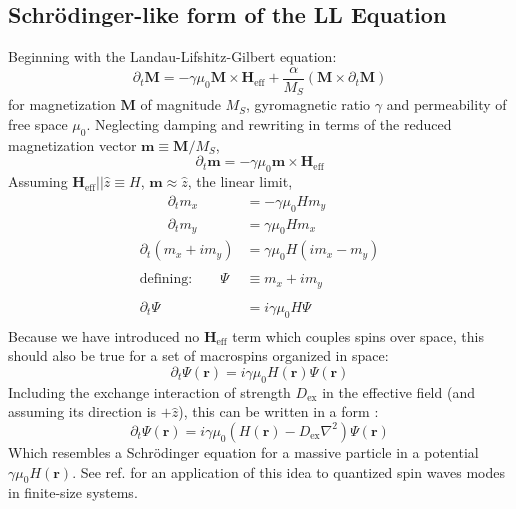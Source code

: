 \documentclass[aps,prx,twocolumn,superscriptaddress,floatfix]{revtex4-2}
\begin{document}
\subsection{Schr{\"o}dinger-like form of the LL Equation}\label{sec:App_Schrodinger}
Beginning with the Landau-Lifshitz-Gilbert equation:
\begin{equation*}
\partial_t\mathbf{M}=-\gamma\mu_0\mathbf{M}\times\mathbf{H}_{\text{eff}} + \dfrac{\alpha}
{M_S}\left(\mathbf{M}\times\partial_t\mathbf{M}\right)
\end{equation*}for magnetization $\mathbf{M}$ of magnitude $M_S$, gyromagnetic ratio $\gamma$ and permeability of free space $\mu_0$. Neglecting damping and rewriting in terms of the reduced magnetization vector $\mathbf{m}\equiv\mathbf{ M}/M_S$,
\begin{equation*}
    \partial_t \mathbf{m}=-\gamma\mu_0\mathbf{m}\times\mathbf{H}_{\text{eff}}
\end{equation*}
Assuming $\mathbf{H}_{\text{eff}}||\hat{z}\equiv H$, $\mathbf{m}\approx \hat{z}$, the linear limit,
\begin{align*}
\qquad\partial_t m_x&=-\gamma \mu_0H m_y\\
\qquad \partial_t m_y&=\gamma \mu_0H m_x\\
\partial_t(m_x+im_y)&=\gamma \mu_0H(im_x-m_y)\\\\
\text{defining:}\qquad \Psi &\equiv m_x+im_y\\\\
\partial_t \Psi&=i\gamma \mu_0H \Psi\\
\end{align*}
Because we have introduced no $\mathbf{H}_{\text{eff}}$ term which couples spins over space, this should also be true for a set of macrospins organized in space: 
\begin{equation*}
    \partial_t\Psi(\mathbf{r})=i\gamma  \mu_0H(\mathbf{r}) \Psi(\mathbf{r})
\end{equation*}
Including the exchange interaction of strength $D_{\text{ex}}$ in the effective field (and assuming its direction is $+\hat{z}$), this can be written in a form \cite{landau_magnetism_nodate, herring_theory_1951, lim_ferromagnetic_2021}:
\begin{equation*}
    \partial_t\Psi(\mathbf{r})=i\gamma  \mu_0\left(H(\mathbf{r})-D_{\text{ex}}\nabla^2\right) \Psi(\mathbf{r})
\end{equation*}
Which resembles a Schr{\"o}dinger equation for a massive particle in a potential $\gamma\mu_0H(\mathbf{r})$. See ref. \cite{lim_ferromagnetic_2021} for an application of this idea to quantized spin waves modes in finite-size systems.
\end{document}
